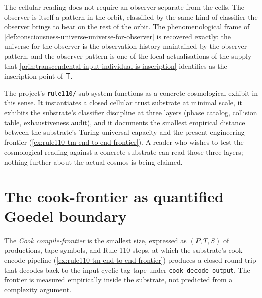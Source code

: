 \begin{remark}
\label{rem:cellular-automaton-observer-as-classifier}
The cellular reading does not require an observer separate from the cells. The observer is itself a pattern in the orbit, classified by the same kind of classifier the observer brings to bear on the rest of the orbit. The phenomenological frame of \autoref{def:consciousness-universe-universe-for-observer} is recovered exactly: the universe-for-the-observer is the observation history maintained by the observer-pattern, and the observer-pattern is one of the local actualisations of the supply that \autoref{prin:transcendental-input-individual-is-inscription} identifies as the inscription point of \(\mathsf{T}\).
\end{remark}

\begin{remark}
\label{rem:cellular-automaton-rule110-as-exhibit}
The project's \texttt{rule110/} sub-system functions as a concrete cosmological exhibit in this sense. It instantiates a closed cellular trust substrate at minimal scale, it exhibits the substrate's classifier discipline at three layers (phase catalog, collision table, exhaustiveness audit), and it documents the smallest empirical distance between the substrate's Turing-universal capacity and the present engineering frontier (\autoref{ex:rule110-tm-end-to-end-frontier}). A reader who wishes to test the cosmological reading against a concrete substrate can read those three layers; nothing further about the actual cosmos is being claimed.
\end{remark}

\section{The cook-frontier as quantified Goedel boundary}
\label{sec:cellular-automaton-reading-frontier-as-goedel}

\begin{definition}
\label{def:cellular-automaton-cook-frontier}
The \emph{Cook compile-frontier} is the smallest size, expressed as \((P, T, S)\) of productions, tape symbols, and Rule 110 steps, at which the substrate's cook-encode pipeline (\autoref{ex:rule110-tm-end-to-end-frontier}) produces a closed round-trip that decodes back to the input cyclic-tag tape under \texttt{cook\_decode\_output}. The frontier is measured empirically inside the substrate, not predicted from a complexity argument.
\end{definition}

